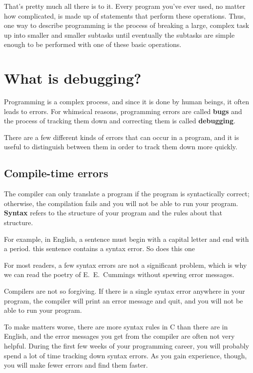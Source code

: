 That's pretty much all there is to it.
Every program you've ever used, no matter how complicated, is
made up of statements that perform these operations.  Thus,
one way to describe programming is the process of breaking a
large, complex task up into smaller and smaller subtasks
until eventually the subtasks are simple enough to be performed
with one of these basic operations.

\section{What is debugging?}

Programming is a complex process, and since it is done by
human beings, it often leads to errors.  For whimsical reasons,
programming errors are called {\bf bugs} and the process
of tracking them down and correcting them is called
{\bf debugging}.

There are a few different kinds of errors that can occur
in a program, and it is useful to distinguish between them
in order to track them down more quickly.

\subsection{Compile-time errors}

The compiler can only translate a program if the program is
syntactically correct; otherwise, the compilation fails and
you will not be able to run your program.  {\bf Syntax}
refers to the structure of your program and the rules about
that structure.


For example, in English, a sentence must begin with a capital
letter and end with a period.  this sentence contains a syntax
error.  So does this one

For most readers, a few syntax errors are not a significant
problem, which is why we can read the poetry of E.~E.~Cummings
without spewing error messages.

Compilers are not so forgiving.  If there is a single syntax
error anywhere in your program, the compiler will print an
error message and quit, and you will not be able to run
your program.

To make matters worse, there are more syntax rules in C
than there are in English, and the error messages you get from
the compiler are often not very helpful.  During the first
few weeks of your programming career, you will probably
spend a lot of time tracking down syntax errors.  As you
gain experience, though, you will make fewer errors and find
them faster.

